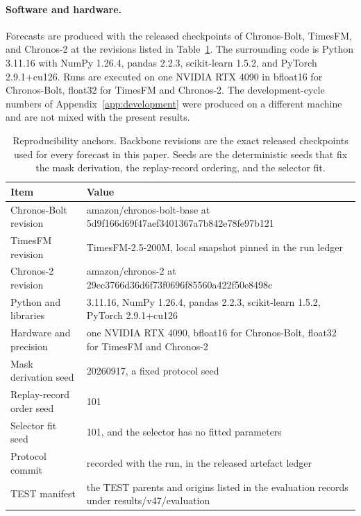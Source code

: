 \documentclass{article}
\begin{document}
\paragraph{Software and hardware.} Forecasts are produced with the released checkpoints of
Chronos-Bolt, TimesFM, and Chronos-2 at the revisions listed in Table~\ref{tab:app-repro}.
The surrounding code is Python 3.11.16 with NumPy 1.26.4, pandas
2.2.3, scikit-learn 1.5.2, and PyTorch 2.9.1+cu126. Runs are
executed on one NVIDIA RTX 4090 in bfloat16 for Chronos-Bolt, float32 for TimesFM and Chronos-2. The development-cycle numbers of
Appendix~\ref{app:development} were produced on a different machine and are not mixed with the
present results.

\begin{table}[htbp]
  \caption{Reproducibility anchors. Backbone revisions are the exact released checkpoints used
  for every forecast in this paper. Seeds are the deterministic seeds that fix the mask
  derivation, the replay-record ordering, and the selector fit.}
  \label{tab:app-repro}
  \centering
  \small
  \setlength{\tabcolsep}{4pt}
  \begin{tabular}{@{}l p{}@{}}
    \toprule
    Item & Value \\
    \midrule
    Chronos-Bolt revision   & amazon/chronos-bolt-base at 5d9f166d69f47aef3401367a7b842e78fe97b121 \\
    TimesFM revision        & TimesFM-2.5-200M, local snapshot pinned in the run ledger \\
    Chronos-2 revision      & amazon/chronos-2 at 29ec3766d36d6f73f0696f85560a422f50e8498c \\
    Python and libraries    & 3.11.16, NumPy 1.26.4, pandas 2.2.3, scikit-learn 1.5.2, PyTorch 2.9.1+cu126 \\
    Hardware and precision  & one NVIDIA RTX 4090, bfloat16 for Chronos-Bolt, float32 for TimesFM and Chronos-2 \\
    Mask derivation seed    & 20260917, a fixed protocol seed \\
    Replay-record order seed & 101 \\
    Selector fit seed       & 101, and the selector has no fitted parameters \\
    Protocol commit         & recorded with the run, in the released artefact ledger \\
    TEST manifest           & the TEST parents and origins listed in the evaluation records under results/v47/evaluation \\
    \bottomrule
  \end{tabular}
\end{table}
\end{document}
